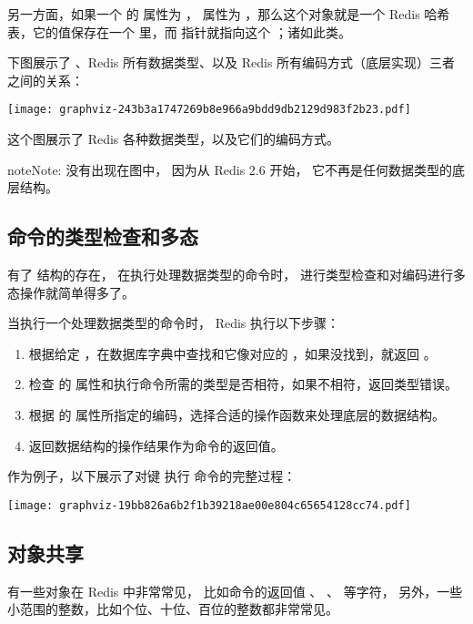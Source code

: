 \documentclass[a4paper,11pt,english]{sphinxmanual}
\begin{document}
另一方面，如果一个  的  属性为  ，  属性为  ，那么这个对象就是一个 Redis 哈希表，它的值保存在一个  里，而  指针就指向这个  ；诸如此类。

下图展示了  、Redis 所有数据类型、以及 Redis 所有编码方式（底层实现）三者之间的关系：

\texttt{[image: graphviz-243b3a1747269b8e966a9bdd9db2129d983f2b23.pdf]}

这个图展示了 Redis 各种数据类型，以及它们的编码方式。

\begin{notice}{note}{Note:}
 没有出现在图中，
因为从 Redis 2.6 开始，
它不再是任何数据类型的底层结构。
\end{notice}


\subsection{命令的类型检查和多态}
\label{datatype/object:id2}
有了  结构的存在，
在执行处理数据类型的命令时，
进行类型检查和对编码进行多态操作就简单得多了。

当执行一个处理数据类型的命令时，
Redis 执行以下步骤：
\begin{enumerate}
\item {} 
根据给定  ，在数据库字典中查找和它像对应的  ，如果没找到，就返回  。

\item {} 
检查  的  属性和执行命令所需的类型是否相符，如果不相符，返回类型错误。

\item {} 
根据  的  属性所指定的编码，选择合适的操作函数来处理底层的数据结构。

\item {} 
返回数据结构的操作结果作为命令的返回值。

\end{enumerate}

作为例子，以下展示了对键  执行  命令的完整过程：

\texttt{[image: graphviz-19bb826a6b2f1b39218ae00e804c65654128cc74.pdf]}


\subsection{对象共享}
\label{datatype/object:id3}
有一些对象在 Redis 中非常常见，
比如命令的返回值  、  、  等字符，
另外，一些小范围的整数，比如个位、十位、百位的整数都非常常见。
\end{document}
